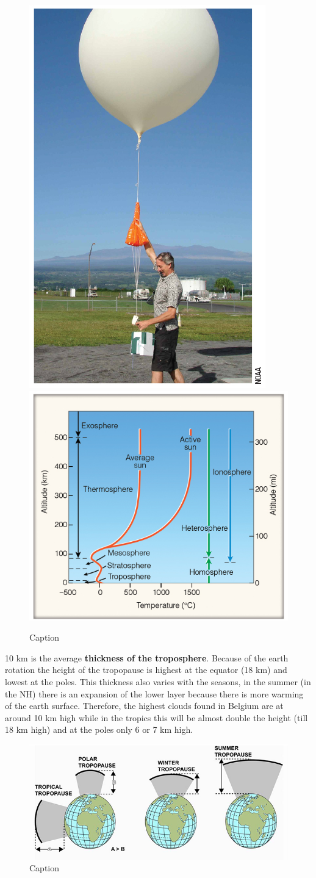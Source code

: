\documentclass[12pt,oneside]{book}
\begin{document}
\begin{figure}

{\centering \includegraphics[width=0.4\linewidth]{figures/Figure14a} \includegraphics[width=0.4\linewidth]{figures/Figure14b} 

}

\caption{Caption}\label{fig:Homosphere}
\end{figure}

10 km is the average \textbf{thickness of the troposphere}. Because of
the earth rotation the height of the tropopause is highest at the
equator (18 km) and lowest at the poles. This thickness also varies with
the seasons, in the summer (in the NH) there is an expansion of the
lower layer because there is more warming of the earth surface.
Therefore, the highest clouds found in Belgium are at around 10 km high
while in the tropics this will be almost double the height (till 18 km
high) and at the poles only 6 or 7 km high.

\begin{figure}

{\centering \includegraphics[width=0.5\linewidth]{figures/Figure15} 

}

\caption{Caption}\label{fig:Thickness}
\end{figure}
\end{document}
